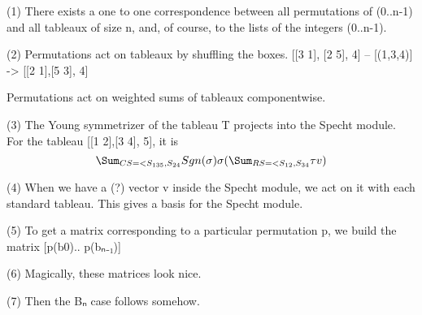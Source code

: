 
(1) There exists a one to one correspondence between all permutations of (0..n-1) and all tableaux of size n, and, of course, to the lists of the integers (0..n-1).

(2) Permutations act on tableaux by shuffling the boxes.  
[[3 1], [2 5], 4] -- [(1,3,4)] -> [[2 1],[5 3], 4]

Permutations act on weighted sums of tableaux componentwise.


(3) The Young symmetrizer of the tableau T projects into the Specht module.  For the tableau [[1 2],[3 4], 5], it is
\[
\Sum_{CS=<S_{135},S_{24}} Sgn(\sigma)\sigma (\Sum_{RS=<S_{12},S_{34}} \tau v)
\]

(4) When we have a (?) vector v inside the Specht module, we act on it with each standard tableau.  This gives a basis for the Specht module.

(5) To get a matrix corresponding to a particular permutation p, we build the matrix [p(b0).. p(bₙ₋₁)] 

(6) Magically, these matrices look nice.

(7) Then the Bₙ case follows somehow.
